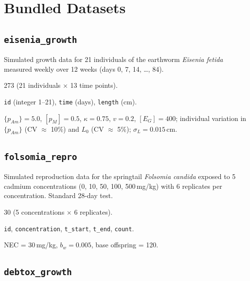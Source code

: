 \documentclass[11pt,a4paper]{article}
\newcommand{\code}[1]{\texttt{#1}}
\begin{document}
\section{Bundled Datasets}
\label{sec:datasets}

\subsection{\code{eisenia\_growth}}

Simulated growth data for 21 individuals of the earthworm \textit{Eisenia
fetida} measured weekly over 12 weeks (days 0, 7, 14, \ldots, 84).

\begin{description}[nosep,leftmargin=3cm]
  \item[Rows] 273 (21 individuals $\times$ 13 time points).
  \item[Columns] \code{id} (integer 1--21), \code{time} (days), \code{length} (cm).
  \item[True parameters] $\{p_{Am}\} = 5.0$, $[p_M] = 0.5$, $\kappa = 0.75$, $v = 0.2$, $[E_G] = 400$; individual variation in $\{p_{Am}\}$ (CV $\approx$ 10\%) and $L_0$ (CV $\approx$ 5\%); $\sigma_L = 0.015$\,cm.
\end{description}

\subsection{\code{folsomia\_repro}}

Simulated reproduction data for the springtail \textit{Folsomia candida}
exposed to 5 cadmium concentrations (0, 10, 50, 100, 500\,mg/kg) with
6 replicates per concentration.  Standard 28-day test.

\begin{description}[nosep,leftmargin=3cm]
  \item[Rows] 30 (5 concentrations $\times$ 6 replicates).
  \item[Columns] \code{id}, \code{concentration}, \code{t\_start}, \code{t\_end}, \code{count}.
  \item[True parameters] NEC = 30\,mg/kg, $b_w = 0.005$, base offspring = 120.
\end{description}

\subsection{\code{debtox\_growth}}
\end{document}
